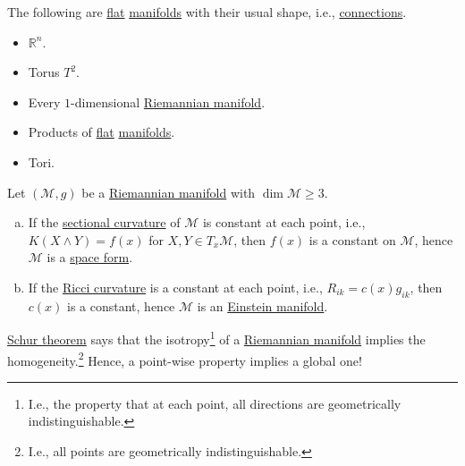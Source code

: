 \begin{eg}
	The following are \hyperref[def:connection-flat]{flat} \hyperref[def:smooth-manifold]{manifolds} with their usual shape, i.e., \hyperref[def:linear-connection]{connections}.
	\begin{multicols}{2}
		\begin{itemize}
			\item \(\mathbb{R} ^n\).
			\item Torus \(T^2\).
			\item Every \(1\)-dimensional \hyperref[def:Riemannian-manifold]{Riemannian manifold}.
			\item Products of \hyperref[def:connection-flat]{flat} \hyperref[def:smooth-manifold]{manifolds}.
			\item Tori.
		\end{itemize}
	\end{multicols}
\end{eg}

\begin{theorem}\label{thm:Schur}
	Let \((\mathcal{M} , g)\) be a \hyperref[def:Riemannian-manifold]{Riemannian manifold} with \(\dim \mathcal{M} \geq 3\).
	\begin{enumerate}[(a)]
		\item If the \hyperref[def:sectional-curvature]{sectional curvature} of \(\mathcal{M} \) is constant at each point, i.e., \(K(X\wedge Y) = f(x)\) for \(X, Y\in T_x \mathcal{M} \), then \(f(x)\) is a constant on \(\mathcal{M} \), hence \(\mathcal{M} \) is a \hyperref[def:space-form]{space form}.
		\item If the \hyperref[def:Ricci-curvature]{Ricci curvature} is a constant at each point, i.e., \(R_{ik} = c(x) g_{ik}\), then \(c(x)\) is a constant, hence \(\mathcal{M} \) is an \hyperref[def:Einstein-manifold]{Einstein manifold}.
	\end{enumerate}
\end{theorem}

\begin{remark}
	\hyperref[thm:Schur]{Schur theorem} says that the isotropy\footnote{I.e., the property that at each point, all directions are geometrically indistinguishable.} of a \hyperref[def:Riemannian-manifold]{Riemannian manifold} implies the homogeneity.\footnote{I.e., all points are geometrically indistinguishable.} Hence, a point-wise property implies a global one!
\end{remark}

